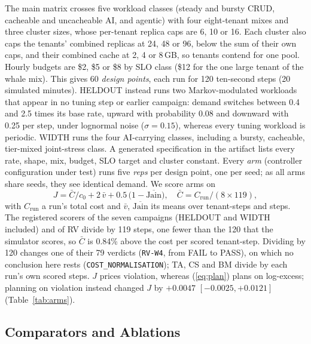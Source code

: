 \documentclass[conference,a4paper]{IEEEtran}
\newcommand{\rec}[1]{\texttt{\small #1}}
\begin{document}
The main matrix crosses five workload classes (steady and bursty CRUD,
cacheable and uncacheable AI, and agentic) with four eight-tenant mixes and
three cluster sizes, whose per-tenant replica caps are 6, 10 or 16. Each cluster
also caps the tenants' combined replicas at 24, 48 or 96, below the sum of
their own caps, and their combined cache at 2, 4 or 8\,GB, so tenants
contend for one pool. Hourly budgets are \$2, \$5 or \$8 by SLO class (\$12
for the one large tenant of the whale mix). This
gives 60 \emph{design points}, each run for 120 ten-second steps (20
simulated minutes). HELDOUT instead runs two Markov-modulated workloads that
appear in no tuning step or earlier campaign: demand switches between 0.4
and 2.5 times its base rate, upward with probability 0.08 and downward with
0.25 per step, under lognormal noise ($\sigma=0.15$), whereas every tuning
workload is periodic. WIDTH runs the four AI-carrying classes, including a
bursty, cacheable, tier-mixed joint-stress class. A generated specification
in the artifact lists every rate, shape, mix, budget, SLO target and cluster
constant. Every
\emph{arm} (controller configuration under test) runs five \emph{reps} per
design point, one per seed; as all arms share seeds, they see identical
demand. We score arms on
\begin{equation}
\label{eq:J}
J=\bar C/c_0+2\,\bar v+0.5\,\bigl(1-\overline{\mathrm{Jain}}\bigr),\quad
\bar C=C_{\mathrm{run}}/(8\times119),
\end{equation}
with $C_{\mathrm{run}}$ a run's total cost and $\bar v$, $\overline{\mathrm{Jain}}$
its means over tenant-steps and steps. The registered scorers of the seven
campaigns (HELDOUT and WIDTH included) and of RV divide by 119 steps, one
fewer than the 120 that the simulator scores, so $\bar C$ is 0.84\% above the
cost per scored tenant-step. Dividing by 120 changes one of their 79
verdicts (\rec{RV-W4}, from FAIL to PASS), on which no conclusion here rests
(\rec{COST\_NORMALISATION}); TA, CS and BM divide by each run's own scored
steps. $J$ prices violation, whereas (\ref{eq:plan}) plans on
log-excess; planning on violation instead changed $J$ by $+0.0047$
$[-0.0025,+0.0121]$ (Table~\ref{tab:arms}).

\subsection{Comparators and Ablations}
\label{sec:comparators}
\end{document}
